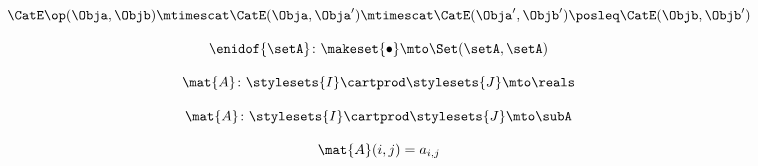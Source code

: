 {\begin{forslides}
        \begin{equation}
            \label{eq:slides_enrichment_71}
            \CatE\op(\Obja, \Objb) \mtimescat \CatE(\Obja, \Obja') \mtimescat \CatE(\Obja', \Objb') \posleq \CatE(\Objb, \Objb')
        \end{equation}

        \begin{equation}
            \label{eq:slides_enrichment_72}
            \enidof{\setA} \colon \makeset{ \bullet } \mto \Set(\setA, \setA)
        \end{equation}

        \begin{equation}
            \label{eq:slides_enrichment_73}
            \mat{A} \colon \stylesets{I} \cartprod \stylesets{J} \mto \reals
        \end{equation}

        \begin{equation}
            \label{eq:slides_enrichment_74}
            \mat{A} \colon \stylesets{I} \cartprod \stylesets{J} \mto \subA
        \end{equation}

        \begin{equation}
            \label{eq:slides_enrichment_75}
            \mat{A}(i, j) = a_{i,j}
        \end{equation}


\end{forslides}}
